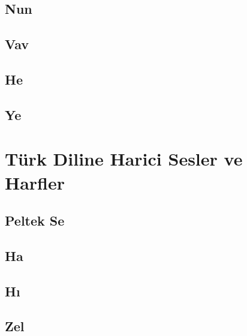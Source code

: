\subsection*{Nun}
\uyumluharftablo{\arnun}{\latupnun\latdownnun}{\isimnun}{\trtlfnun}

\subsection*{Vav}
\uyumluharftablo{\arvav}{\latupvav\latdownvav}{\isimvav}{\trtlfvav}

\subsection*{He}
\uyumluharftablo{\arhe}{\latuphe\latdownhe}{\isimhe}{\trtlfhe}

\subsection*{Ye}
\uyumluharftablo{\arye}{\latupye\latdownye}{\isimye}{\trtlfye}



\section{Türk Diline Harici Sesler ve Harfler}

\subsection*{Peltek Se}
\hariciharftablo{\arthe}{\latupthe\latdownthe}{\isimthe}{\trtlfthe}{\artlfthe}

\subsection*{Ha}
\hariciharftablo{\arha}{\latupha\latdownha}{\isimha}{\trtlfha}{\artlfha}

\subsection*{Hı}
\hariciharftablo{\arxa}{\latupxa\latdownxa}{\isimxa}{\trtlfxa}{\artlfxa}

\subsection*{Zel}
\hariciharftablo{\arzel}{\latupzel\latdownzel}{\isimzel}{\trtlfzel}{\artlfzel}

